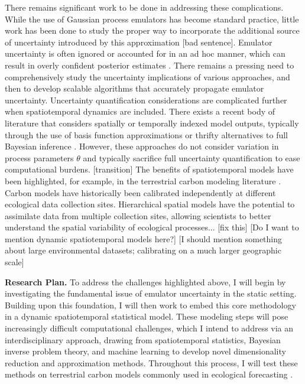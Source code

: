 \documentclass[12pt]{article}
\begin{document}
 There remains significant work to be done in addressing these complications. While the use of Gaussian process emulators has become standard practice, little work has been done to study the proper way to incorporate the additional source of uncertainty introduced by this approximation [bad sentence]. Emulator uncertainty is often ignored or accounted for in an ad hoc manner, which can result in overly confident posterior estimates \cite{Cleary, Fer}. There remains a pressing need to comprehensively study the uncertainty implications of various approaches, and then to develop scalable algorithms that accurately propagate emulator uncertainty. Uncertainty quantification considerations are complicated further when spatiotemporal dynamics are included. There exists a recent body of literature that considers spatially or temporally indexed model outputs, typically through the use of basis function approximations \cite{Fadikar} or thrifty alternatives to full Bayesian inference \cite{Sun}. However, these approaches do not consider variation in process 
 parameters $\theta$ and typically sacrifice full uncertainty quantification to ease computational burdens. [transition] The benefits of spatiotemporal models have been
 highlighted, for example, in the terrestrial carbon modeling literature \cite{Fer2}. Carbon models have historically been calibrated independently at different 
 ecological data collection sites. Hierarchical spatial models have the potential to assimilate data from multiple collection sites, allowing scientists to better understand the spatial variability of ecological processes... [fix this] [Do I want to mention dynamic spatiotemporal models here?] 
 [I should mention something about large environmental datasets; calibrating on a much larger geographic scale]

\noindent
\textbf{Research Plan.} To address the challenges highlighted above, I will begin by investigating the fundamental issue of emulator uncertainty in the 
static setting. Building upon this foundation, I will then work to embed this core methodology in a dynamic spatiotemporal statistical model. These modeling steps will pose increasingly difficult computational challenges, which I intend to address via an interdisciplinary approach, drawing from spatiotemporal statistics, Bayesian inverse problem theory, and machine learning to develop novel dimensionality reduction and approximation methods. Throughout this process, I will test these methods on terrestrial carbon models commonly used in ecological forecasting \cite{Dietze, Canadell}.  
 
\end{document}
